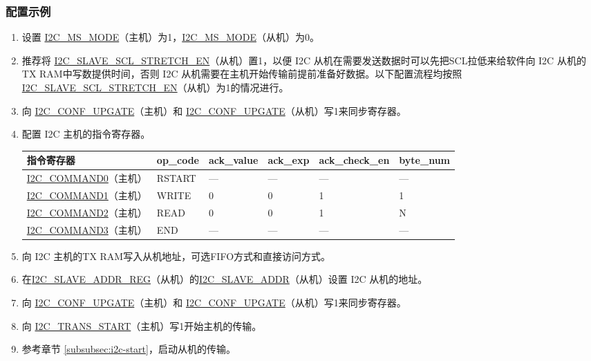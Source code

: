 \documentclass[main\_\_CN.tex]{subfiles}
\begin{document}
\subsubsection{配置示例}
\begin{enumerate}
\item 设置 \hyperref[fielddesc:I2CMSMODE]{I2C\_MS\_MODE}（主机）为1，\hyperref[fielddesc:I2CMSMODE]{I2C\_MS\_MODE}（从机）为0。
\item 推荐将 \hyperref[fielddesc:I2CSLAVESCLSTRETCHEN]{I2C\_SLAVE\_SCL\_STRETCH\_EN}（从机）置1，以便 I2C 从机在需要发送数据时可以先把SCL拉低来给软件向 I2C 从机的TX RAM中写数提供时间，否则 I2C 从机需要在主机开始传输前提前准备好数据。以下配置流程均按照\hyperref[fielddesc:I2CSLAVESCLSTRETCHEN]{I2C\_SLAVE\_SCL\_STRETCH\_EN}（从机）为1的情况进行。 
\item 向 \hyperref[fielddesc:I2CCONFUPGATE]{I2C\_CONF\_UPGATE}（主机）和 \hyperref[fielddesc:I2CCONFUPGATE]{I2C\_CONF\_UPGATE}（从机）写1来同步寄存器。
\item 配置 I2C 主机的指令寄存器。
\begin{longtable}{ | p{4cm} | p{2cm} | p{2cm} | p{2cm} |p{2cm} | p{2cm} |}
\hline\rowcolor{lightgray}
指令寄存器& op\_code & ack\_value&ack\_exp&ack\_check\_en&byte\_num  \\ \hline
\hyperref[fielddesc:I2CCOMMAND0]{I2C\_COMMAND0}（主机）& RSTART& ---&---&---&---  \\ \hline
\hyperref[fielddesc:I2CCOMMAND1]{I2C\_COMMAND1}（主机）& WRITE& 0&0&1&1  \\ \hline
\hyperref[fielddesc:I2CCOMMAND2]{I2C\_COMMAND2}（主机）& READ& 0&0&1&N  \\ \hline
\hyperref[fielddesc:I2CCOMMAND3]{I2C\_COMMAND3}（主机）& END& ---&---&---&---  \\ \hline
\end{longtable}
\item 向 I2C 主机的TX RAM写入从机地址，可选FIFO方式和直接访问方式。
\item 在\hyperref[regdesc:I2CSLAVEADDRREG]{I2C\_SLAVE\_ADDR\_REG}（从机）的\hyperref[fielddesc:I2CSLAVEADDR]{I2C\_SLAVE\_ADDR}（从机）设置 I2C 从机的地址。
\item 向 \hyperref[fielddesc:I2CCONFUPGATE]{I2C\_CONF\_UPGATE}（主机）和 \hyperref[fielddesc:I2CCONFUPGATE]{I2C\_CONF\_UPGATE}（从机）写1来同步寄存器。
\item 向 \hyperref[fielddesc:I2CTRANSSTART]{I2C\_TRANS\_START}（主机）写1开始主机的传输。
\item 参考章节 \ref{subsubsec:i2c-start}，启动从机的传输。

\end{enumerate}
\end{document}
